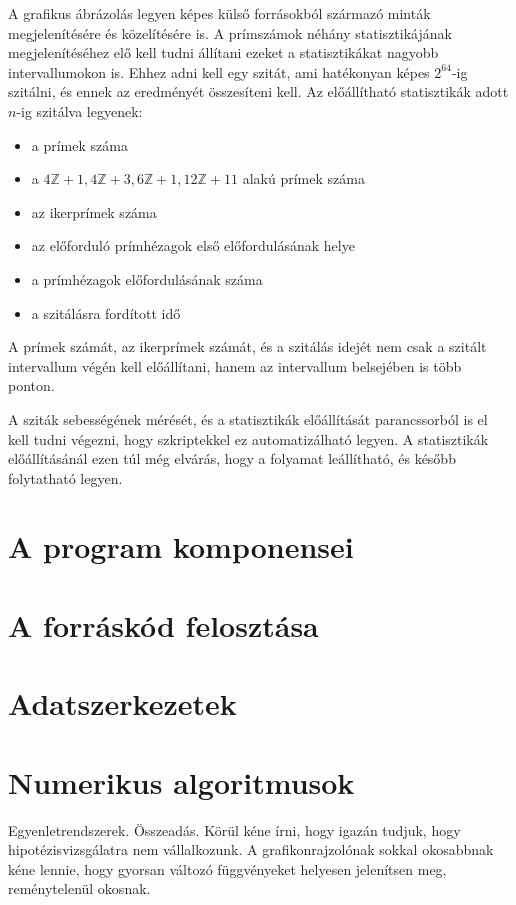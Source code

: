 \documentclass[12pt]{report}
\begin{document}
A grafikus ábrázolás legyen képes külső forrásokból származó minták megjelenítésére
és közelítésére is. A prímszámok néhány statisztikájának megjelenítéséhez elő kell tudni
állítani ezeket a statisztikákat nagyobb intervallumokon is.
Ehhez adni kell egy szitát, ami hatékonyan képes $2^{64}$-ig szitálni,
és ennek az eredményét összesíteni kell. Az előállítható statisztikák
adott $n$-ig szitálva legyenek:
\begin{itemize}
\item a prímek száma
\item a $4\mathbb{Z}+1, 4\mathbb{Z}+3, 6\mathbb{Z}+1, 12\mathbb{Z}+11$
	alakú prímek száma
\item az ikerprímek száma
\item az előforduló prímhézagok első előfordulásának helye
\item a prímhézagok előfordulásának száma
\item a szitálásra fordított idő
\end{itemize}

A prímek számát, az ikerprímek számát, és a szitálás idejét
nem csak a szitált intervallum végén
kell előállítani, hanem az intervallum belsejében is több ponton.

A sziták sebességének mérését, és a statisztikák előállítását
parancssorból is el kell tudni végezni, hogy szkriptekkel ez automatizálható legyen.
A statisztikák előállításánál ezen túl még elvárás, hogy a folyamat leállítható,
és később folytatható legyen.

\section{A program komponensei}

\section{A forráskód felosztása}

\section{Adatszerkezetek}

\section{Numerikus algoritmusok}

Egyenletrendszerek. Összeadás.
Körül kéne írni, hogy igazán tudjuk, hogy hipotézisvizsgálatra nem vállalkozunk.
A grafikonrajzolónak sokkal okosabbnak kéne lennie, hogy gyorsan változó függvényeket
helyesen jelenítsen meg, reménytelenül okosnak.
\end{document}
